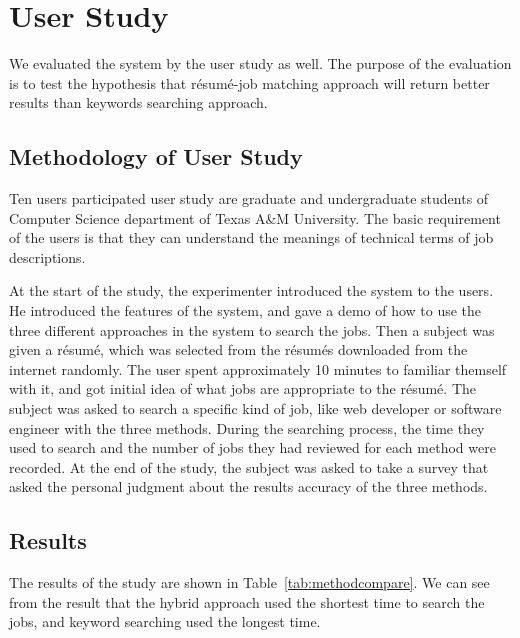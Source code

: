 
\section{User Study}

We evaluated the system by the user study as well. The purpose of the evaluation is to test the hypothesis that r\'esum\'e-job matching approach will return better results than keywords searching approach.

\subsection{Methodology of User Study}

Ten users participated user study are graduate and undergraduate students of Computer Science department of Texas A\&M University. The basic requirement of the users is that they can understand the meanings of technical terms of job descriptions.

At the start of the study, the experimenter introduced the system to the users. He introduced the features of the system, and gave a demo of how to use the three different approaches in the system to search the jobs. Then a subject was given a r\'esum\'e, which was selected from the r\'esum\'es downloaded from the internet randomly. The user spent approximately 10 minutes to familiar themself with it, and got initial idea of what jobs are appropriate to the r\'esum\'e. The subject was asked to search a specific kind of job, like web developer or software engineer with the three methods. During the searching process, the time they used to search and the number of jobs they had reviewed for each method were recorded.  At the end of the study, the subject was asked to take a survey that asked  the personal judgment about the results accuracy of the three methods.


\subsection{Results}

The results of the study are shown in Table~\ref{tab:methodcompare}. We can see from the result that the hybrid approach used the shortest time to search the jobs, and keyword searching used the longest time.


